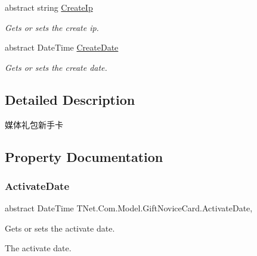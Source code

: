 \begin{DoxyCompactItemize}
abstract string \mbox{\hyperlink{class_t_net_1_1_com_1_1_model_1_1_gift_novice_card_a7bb8120cbabf8dd6bcaeb726c4ceb92d}{Create\+Ip}}
\begin{DoxyCompactList}\small\item\em Gets or sets the create ip. \end{DoxyCompactList}\item 
abstract Date\+Time \mbox{\hyperlink{class_t_net_1_1_com_1_1_model_1_1_gift_novice_card_aeb207c6008813ed6f50a5d3843eae155}{Create\+Date}}
\begin{DoxyCompactList}\small\item\em Gets or sets the create date. \end{DoxyCompactList}\end{DoxyCompactItemize}


\subsection{Detailed Description}
媒体礼包新手卡 



\subsection{Property Documentation}
\mbox{\label{class_t_net_1_1_com_1_1_model_1_1_gift_novice_card_a9f83a30648bc8bb6070e7b7055f4efdb}} 
\subsubsection{\texorpdfstring{Activate\+Date}{ActivateDate}}
{\footnotesize\ttfamily abstract Date\+Time T\+Net.\+Com.\+Model.\+Gift\+Novice\+Card.\+Activate\+Date\hspace{0.3cm}{\ttfamily [get]}, {\ttfamily [set]}}



Gets or sets the activate date. 

The activate date.\mbox{\label{class_t_net_1_1_com_1_1_model_1_1_gift_novice_card_a8d3dd9be1cf27915e2d32fd921476017}} 
